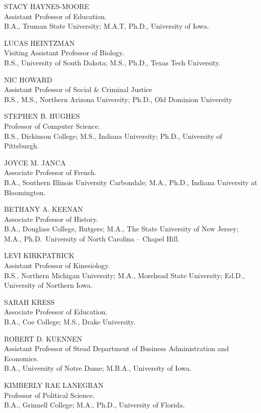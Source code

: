 \documentclass[
  letterpaper,
]{scrbook}
\begin{document}
STACY HAYNES-MOORE\\
Assistant Professor of Education.\\
B.A., Truman State University; M.A.T, Ph.D., University of Iowa.

LUCAS HEINTZMAN\\
Visiting Assistant Professor of Biology.\\
B.S., University of South Dakota; M.S., Ph.D., Texas Tech University.

NIC HOWARD\\
Assistant Professor of Social \& Criminal Justice\\
B.S., M.S., Northern Arizona University; Ph.D., Old Dominion University

STEPHEN B. HUGHES\\
Professor of Computer Science.\\
B.S., Dickinson College; M.S., Indiana University; Ph.D., University of
Pittsburgh.

JOYCE M. JANCA\\
Associate Professor of French.\\
B.A., Southern Illinois University Carbondale; M.A., Ph.D., Indiana
University at Bloomington.

BETHANY A. KEENAN\\
Associate Professor of History.\\
B.A., Douglass College, Rutgers; M.A., The State University of New
Jersey; M.A., Ph.D.~University of North Carolina -- Chapel Hill.

LEVI KIRKPATRICK\\
Assistant Professor of Kinesiology.\\
B.S., Northern Michigan University; M.A., Morehead State University;
Ed.D., University of Northern Iowa.

SARAH KRESS\\
Associate Professor of Education.\\
B.A., Coe College; M.S., Drake University.

ROBERT D. KUENNEN\\
Assistant Professor of Stead Department of Business Administration and
Economics.\\
B.A., University of Notre Dame; M.B.A., University of Iowa.

KIMBERLY RAE LANEGRAN\\
Professor of Political Science.\\
B.A., Grinnell College; M.A., Ph.D., University of Florida.
\end{document}
